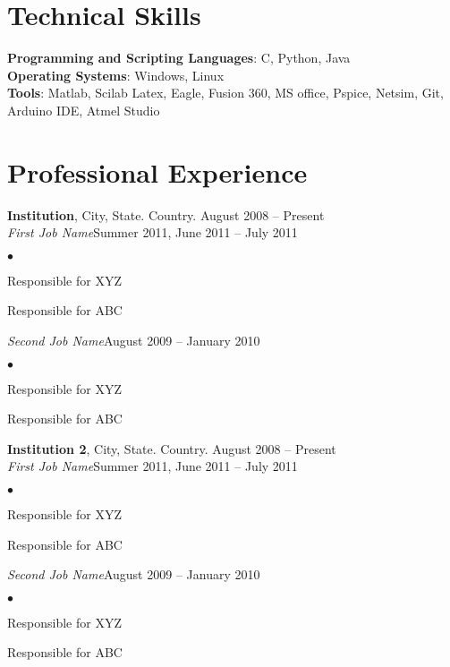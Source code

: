 \documentclass[margin,line]{res}
\newenvironment{list2}{
  \begin{list}{$\bullet$}{%
      \setlength{\itemsep}{0in}
      \setlength{\parsep}{0in} \setlength{\parskip}{0in}
      \setlength{\topsep}{0in} \setlength{\partopsep}{0in}
      \setlength{\leftmargin}{0.2in}}}{\end{list}}
\begin{document}
\begin{resume}
\section{\sc Technical Skills}
{\bf Programming and Scripting Languages}:  C, Python, Java \\
{\bf Operating Systems}: Windows, Linux\\
{\bf Tools}: Matlab, Scilab Latex, Eagle, Fusion 360, MS office, Pspice, Netsim, Git, Arduino IDE, Atmel Studio\\
\section{\sc Professional Experience}
{\bf Institution}, City, State. Country. \hfill{August 2008 -- Present}\\
{\em First Job Name}\hfill {Summer 2011, June 2011 -- July 2011}\\
\begin{list2} %
\item Responsible for XYZ \\
\item Responsible for ABC\\
\end{list2}
{\em Second Job Name}\hfill {August 2009 -- January 2010}\\
\begin{list2} %
\item Responsible for XYZ \\
\item Responsible for ABC\\
\end{list2}
{\bf Institution 2}, City, State. Country. \hfill{August 2008 -- Present}\\
{\em First Job Name}\hfill {Summer 2011, June 2011 -- July 2011}\\
\begin{list2} %
\item Responsible for XYZ \\
\item Responsible for ABC\\
\end{list2}
{\em Second Job Name}\hfill {August 2009 -- January 2010}\\
\begin{list2} %
\item Responsible for XYZ \\
\item Responsible for ABC\\
\end{list2}

\end{resume}
\end{document}
